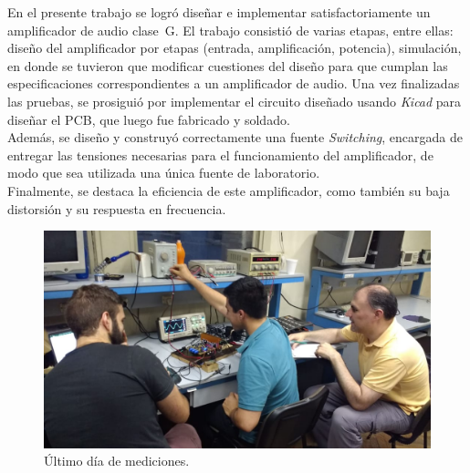 

En el presente trabajo se logró diseñar e implementar satisfactoriamente un amplificador de audio clase~G. El trabajo consistió de varias etapas, entre ellas: diseño del amplificador por etapas (entrada, amplificación, potencia), simulación, en donde se tuvieron que modificar cuestiones del diseño para que cumplan las especificaciones correspondientes a un amplificador de audio. Una vez finalizadas las pruebas, se prosiguió por implementar el circuito diseñado usando \textit{Kicad} para diseñar el PCB, que luego fue fabricado y soldado.\\

Además, se diseño y construyó correctamente una fuente \textit{Switching}, encargada de entregar las tensiones necesarias para el funcionamiento del amplificador, de modo que sea utilizada una única fuente de laboratorio.\\


Finalmente, se destaca la eficiencia de este amplificador, como también su baja distorsión y su respuesta en frecuencia. 







\begin{figure}[H]
    \centering
    \includegraphics[scale=.4]{img/fotos/Dream_Team.jpeg}
    \caption{Último día de mediciones.}
    \label{fig:grupo_midiendo}
\end{figure}